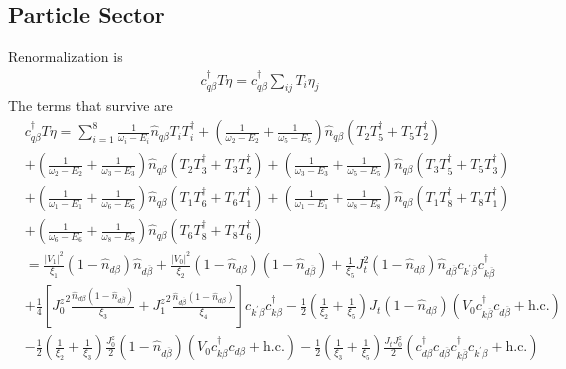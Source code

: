\documentclass[twoside,11pt]{report}
\numberwithin{equation}{section}
\begin{document}
\subsection{Particle Sector}
Renormalization is
\begin{equation}\begin{aligned}
	c^\dagger_{q\beta}T \eta = c^\dagger_{q\beta}\sum_{ij}T_i \eta_j
\end{aligned}\end{equation}
The terms that survive are
\begin{equation}\begin{aligned}
& c^\dagger_{q\beta}T \eta
= \sum_{i=1}^8\frac{1}{\omega_i - E_i}\hat n_{q\beta} T_i T_i^\dagger +\left(\frac{1}{\omega_2 - E_2} + \frac{1}{\omega_5 - E_5}\right)\hat n_{q\beta} \left(T_2 T_5^\dagger + T_5 T_2^\dagger \right) \\
& +\left(\frac{1}{\omega_2 - E_2} + \frac{1}{\omega_3 - E_3}\right)\hat n_{q\beta} \left(T_2 T_3^\dagger + T_3 T_2^\dagger \right) + \left(\frac{1}{\omega_3 - E_3} + \frac{1}{\omega_5 - E_5}\right)\hat n_{q\beta} \left(T_3 T_5^\dagger + T_5 T_3^\dagger \right) \\
& + \left(\frac{1}{\omega_1 - E_1} + \frac{1}{\omega_6 - E_6}\right)\hat n_{q\beta} \left(T_1 T_6^\dagger + T_6 T_1^\dagger \right) + \left(\frac{1}{\omega_1 - E_1} + \frac{1}{\omega_8 - E_8}\right)\hat n_{q\beta} \left(T_1 T_8^\dagger + T_8 T_1^\dagger \right) \\
& + \left(\frac{1}{\omega_6 - E_6} + \frac{1}{\omega_8 - E_8}\right)\hat n_{q\beta} \left(T_6 T_8^\dagger + T_8 T_6^\dagger \right)\\
&=\frac{|V_1|^2}{\xi_1}\left( 1 - \hat n_{d\beta} \right) \hat n_{d\overline\beta} + \frac{|V_0|^2}{\xi_2}\left( 1 - \hat n_{d\beta} \right) \left( 1 - \hat n_{d\overline\beta} \right) + \frac{1}{\xi_5}J_t^2 \left( 1 - \hat n_{d\beta} \right) \hat n_{d\overline\beta} c_{k^\prime\overline\beta}c^\dagger_{k\overline\beta} \\
&+ \frac{1}{4}\left[ {J_0^z}^2\frac{\hat n_{d\beta}\left( 1 - \hat n_{d\overline\beta} \right) }{\xi_3} + {J_1^z}^2\frac{\hat n_{d\overline\beta}\left( 1 - \hat n_{d\beta} \right)}{\xi_4} \right]c_{k^\prime\beta}c^\dagger_{k\beta} - \frac{1}{2} \left(\frac{1}{\xi_2} + \frac{1}{\xi_5}\right)J_t\left( 1 - \hat n_{d\beta}\right) \left(V_0 c^\dagger_{k\overline\beta}c_{d\overline\beta} + \text{h.c.}\right) \\
&- \frac{1}{2}\left(\frac{1}{\xi_2} + \frac{1}{\xi_3}\right)\frac{J^z_0}{2}\left(1 - \hat n_{d\overline\beta}\right)\left(V_0 c^\dagger_{k\beta}c_{d\beta} + \text{h.c.}\right) - \frac{1}{2}\left(\frac{1}{\xi_3} + \frac{1}{\xi_5}\right)\frac{J_t J^z_0}{2}\left(c^\dagger_{d\beta}c_{d\overline\beta}c^\dagger_{k\overline\beta}c_{k^\prime\beta} + \text{h.c.}\right) \\

\end{aligned}
\end{equation}
\end{document}
